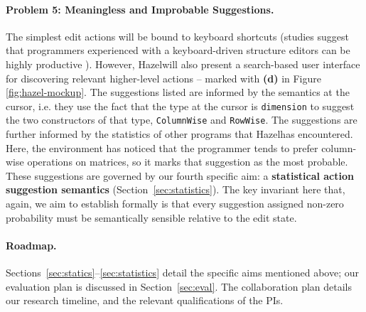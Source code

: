 \documentclass[letterpaper,USenglish]{lipics-v2016}
\let\li\lstinline
\newcommand{\Hazel}[0]{\textsf{Hazel}}
\newcommand{\HazelEnv}[0]{\Hazel}
\begin{document}
\paragraph{Problem 5: Meaningless and Improbable Suggestions.} The simplest 
edit actions will be bound to keyboard shortcuts (studies suggest that programmers experienced with a keyboard-driven structure editors can be highly productive \cite{DBLP:conf/vl/Asenov014}). However, \HazelEnv will 
also present a search-based user
interface for discovering relevant higher-level actions -- marked with \textbf{(d)} in Figure \ref{fig:hazel-mockup}. 
The suggestions 
listed are informed by the semantics at the cursor, i.e. they use the fact that
the type at the cursor is \li{dimension} to suggest the two constructors of that
type, \li{ColumnWise} and \li{RowWise}. The suggestions are further informed by
the statistics of other programs that \HazelEnv has encountered.  Here, the
environment has noticed that the programmer tends to prefer column-wise operations on 
matrices, so it marks that suggestion as the most probable. These suggestions are governed by
our fourth specific aim: a \textbf{statistical action suggestion semantics} (Section~\ref{sec:statistics}). The key invariant here that, again, we aim to establish 
formally is that every suggestion assigned non-zero probability must be semantically sensible 
relative to the edit state.%

\paragraph{Roadmap.} Sections~\ref{sec:statics}--\ref{sec:statistics} detail the
specific aims mentioned above; our evaluation plan is discussed in Section~\ref{sec:eval}.
The collaboration plan details our 
research timeline, and the relevant qualifications of the PIs.


\end{document}
